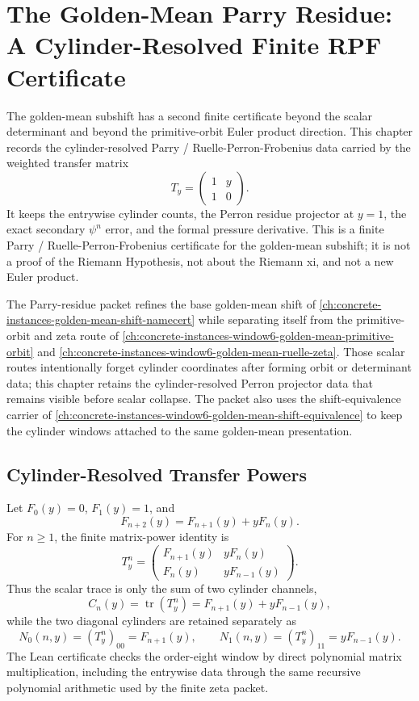 \chapter{The Golden-Mean Parry Residue: A Cylinder-Resolved Finite RPF Certificate}
\label{ch:concrete-instances-window6-golden-mean-parry-residue}

The golden-mean subshift has a second finite certificate beyond the scalar determinant and beyond the primitive-orbit Euler product direction. This chapter records the cylinder-resolved Parry / Ruelle-Perron-Frobenius data carried by the weighted transfer matrix
$$
T_y=\begin{pmatrix}1&y\\1&0\end{pmatrix}.
$$
It keeps the entrywise cylinder counts, the Perron residue projector at $y=1$, the exact secondary $\psi^n$ error, and the formal pressure derivative. This is a finite Parry / Ruelle-Perron-Frobenius certificate for the golden-mean subshift; it is not a proof of the Riemann Hypothesis, not about the Riemann xi, and not a new Euler product.

The Parry-residue packet refines the base golden-mean shift of \autoref{ch:concrete-instances-golden-mean-shift-namecert} while separating itself from the primitive-orbit and zeta route of \autoref{ch:concrete-instances-window6-golden-mean-primitive-orbit} and \autoref{ch:concrete-instances-window6-golden-mean-ruelle-zeta}. Those scalar routes intentionally forget cylinder coordinates after forming orbit or determinant data; this chapter retains the cylinder-resolved Perron projector data that remains visible before scalar collapse. The packet also uses the shift-equivalence carrier of \autoref{ch:concrete-instances-window6-golden-mean-shift-equivalence} to keep the cylinder windows attached to the same golden-mean presentation.

\section{Cylinder-Resolved Transfer Powers}
\label{sec:window6-parry-residue-cylinder-powers}

Let $F_0(y)=0$, $F_1(y)=1$, and
$$
F_{n+2}(y)=F_{n+1}(y)+yF_n(y).
$$
For $n\ge1$, the finite matrix-power identity is
$$
T_y^n=
\begin{pmatrix}
F_{n+1}(y)&yF_n(y)\\
F_n(y)&yF_{n-1}(y)
\end{pmatrix}.
$$
Thus the scalar trace is only the sum of two cylinder channels,
$$
C_n(y)=\operatorname{tr}(T_y^n)=F_{n+1}(y)+yF_{n-1}(y),
$$
while the two diagonal cylinders are retained separately as
$$
N_0(n,y)=(T_y^n)_{00}=F_{n+1}(y),
\qquad
N_1(n,y)=(T_y^n)_{11}=yF_{n-1}(y).
$$
The Lean certificate checks the order-eight window by direct polynomial matrix multiplication, including the entrywise data through the same recursive polynomial arithmetic used by the finite zeta packet.

